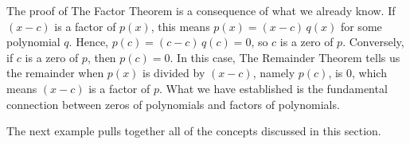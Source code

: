 \smallskip


\smallskip

The proof of The Factor Theorem is a consequence of what we already know.  If $(x-c)$ is a factor of $p(x)$, this means $p(x) = (x-c) \, q(x)$ for some polynomial $q$.  Hence, $p(c) = (c-c) \, q(c) = 0$, so $c$ is a zero of $p$.  Conversely, if $c$ is a zero of $p$, then $p(c) = 0$. In this case, The Remainder Theorem tells us the remainder when $p(x)$ is divided by $(x-c)$, namely $p(c)$, is $0$, which means $(x-c)$ is a factor of $p$.  What we have established is the fundamental connection between zeros of polynomials and factors of polynomials.  

\smallskip



The next example pulls together all of the concepts discussed in this section.  

\medskip

